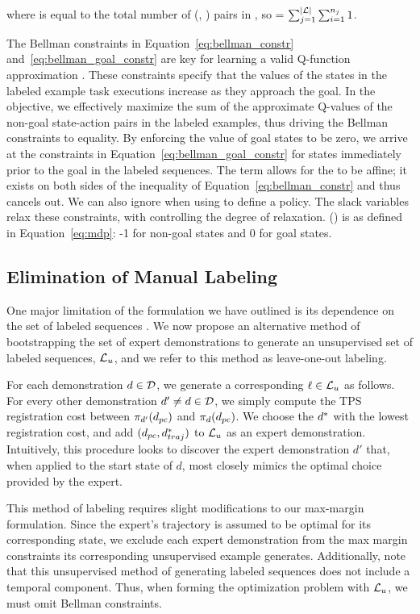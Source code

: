 where  is equal to the total number of
(\statevar{}, \actionvar{}) pairs in , so  = 
$\sum_{j=1}^{|\mathcal{L}|{}} \sum_{i=1}^{n_{j}} 1$.


The Bellman constraints in Equation~\ref{eq:bellman_constr} and~\ref{eq:bellman_goal_constr}
are key for learning a valid Q-function approximation \approxq. These constraints specify that
the values of the states in the labeled example task executions increase as they
approach the goal. In the objective, we effectively maximize the sum of the
approximate Q-values of the non-goal state-action pairs in the labeled examples,
thus driving the Bellman constraints to equality. By enforcing the value of goal states
to be zero, we arrive at the constraints in Equation~\ref{eq:bellman_goal_constr} for
states immediately prior to the goal in the labeled sequences.
The \weightszero{} term allows for the \approxq{} to be affine; it exists on
both sides of the inequality of Equation~\ref{eq:bellman_constr} and thus cancels out.
We can also ignore \weightszero{} when using \approxq{} to define a policy. The slack variables
 relax these constraints, with \bellmanslackc{} controlling
the degree of relaxation.
\rewardfn{}(\statevar{}) is as defined in Equation~\ref{eq:mdp}:
-1 for non-goal states and 0 for goal states.

\subsection{Elimination of Manual Labeling}
\label{subsec:lool}
One major limitation of the formulation we have outlined is its dependence on
the set of labeled sequences . We now propose an alternative method
of bootstrapping the set of expert demonstrations \demoset{} to generate an
unsupervised set of labeled sequences, $\mathcal{L}{}_u$, and we refer to this
method as leave-one-out labeling.

For each demonstration $d{} \in \mathcal{D}{}$, we generate a corresponding
$\ell \in \mathcal{L}_u$ as follows. For every other demonstration
$d{}' \neq d{} \in \mathcal{D}{}$, we simply compute the TPS
registration cost between $\pi_{d{}'}(d_{pc})$ and
$\pi_{d{}}(d{}_{pc})$. We choose the $d{}^*$ with the
lowest registration cost, and add $(d{}_{pc}, d{}^*_{traj})$ to
$\mathcal{L}{}_u$ as an expert demonstration. Intuitively, this procedure looks to
discover the expert demonstration $d'$ that, when applied to the start state of
$d$, most closely mimics the optimal choice provided by the expert.

This method of labeling requires slight modifications to our max-margin
formulation. Since the expert's trajectory is assumed to be optimal for its
corresponding state, we exclude each expert demonstration from the max margin
constraints its corresponding unsupervised example generates. Additionally, note
that this unsupervised method of generating labeled sequences does not include a
temporal component. Thus, when forming the optimization problem with
$\mathcal{L}{}_u$, we must omit Bellman constraints.
